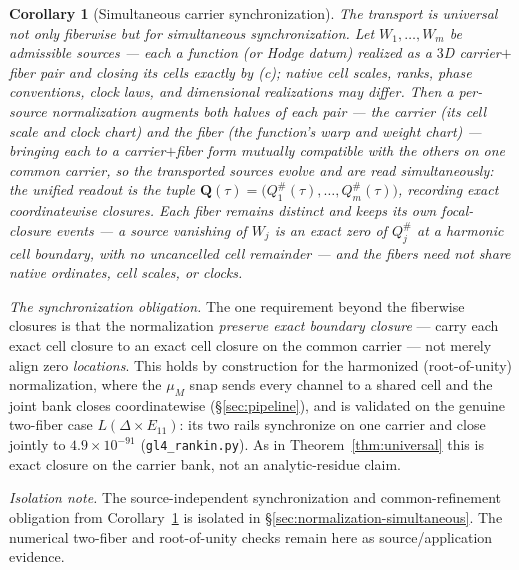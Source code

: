 \documentclass[11pt]{article}
\newtheorem{corollary}[theorem]{Corollary}
\theoremstyle{definition}
\begin{document}
\begin{corollary}[Simultaneous carrier synchronization]\label{cor:sync}
The transport is universal not only fiberwise but for \emph{simultaneous synchronization}. Let $W_1,\dots,W_m$ be
admissible sources --- each a function (or Hodge datum) realized as a $3$D carrier$+$fiber pair and closing its
cells exactly by \textup{(c)}; native cell scales, ranks, phase conventions, clock laws, and dimensional
realizations may differ. Then a per-source \emph{normalization} augments \emph{both} halves of each pair --- the
carrier (its cell scale and clock chart) and the fiber (the function's warp and weight chart) --- bringing each to
a carrier$+$fiber form mutually compatible with the others on one common carrier, so the transported sources
evolve and are read \emph{simultaneously}: the unified readout is the tuple
$\mathbf Q(\tau)=\big(Q_1^\#(\tau),\dots,Q_m^\#(\tau)\big)$, recording exact coordinatewise closures. Each fiber
remains distinct and keeps its own focal-closure events --- a source vanishing of $W_j$ is an exact zero of
$Q_j^\#$ at a harmonic cell boundary, with no uncancelled cell remainder --- and the fibers need not share native
ordinates, cell scales, or clocks.
\end{corollary}

\emph{The synchronization obligation.} The one requirement beyond the fiberwise closures is that the
normalization \emph{preserve exact boundary closure} --- carry each exact cell closure to an exact cell closure on
the common carrier --- not merely align zero \emph{locations}. This holds by construction for the harmonized
(root-of-unity) normalization, where the $\mu_M$ snap sends every channel to a shared cell and the joint bank
closes coordinatewise (\S\ref{sec:pipeline}), and is validated on the genuine two-fiber case $L(\Delta\times
E_{11})$: its two rails synchronize on one carrier and close jointly to $4.9\times10^{-91}$
(\texttt{gl4\_rankin.py}). As in Theorem~\ref{thm:universal} this is exact closure on the carrier bank, not an
analytic-residue claim.

\noindent\emph{Isolation note.} The source-independent synchronization and
common-refinement obligation from Corollary~\ref{cor:sync} is isolated in
\S\ref{sec:normalization-simultaneous}.  The numerical two-fiber and
root-of-unity checks remain here as source/application evidence.
\end{document}
